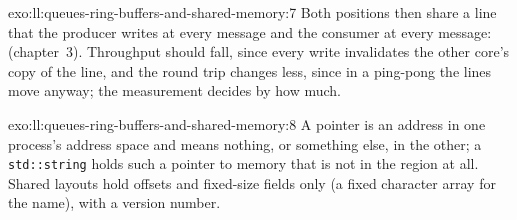 \begin{solution}{exo:ll:queues-ring-buffers-and-shared-memory:7}
Both positions then share a line that the producer writes at every message and the consumer at every message: 
(chapter~3). Throughput should fall, since every write invalidates the other core's copy of the line, and the round trip changes
less, since in a ping-pong the lines move anyway; the measurement decides by how much.
\end{solution}

\begin{solution}{exo:ll:queues-ring-buffers-and-shared-memory:8}
A pointer is an address in one process's address space and means nothing, or something else, in the other; a
\texttt{std::string} holds such a pointer to memory that is not in the region at all. Shared layouts hold offsets and fixed-size
fields only (a fixed character array for the name), with a version number.
\end{solution}

